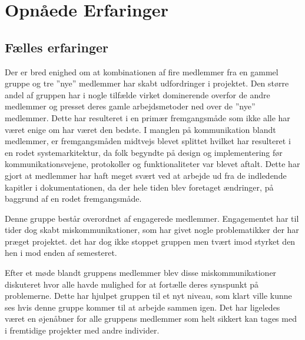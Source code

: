 \chapter{Opnåede Erfaringer}
\section{Fælles erfaringer}
Der er bred enighed om at kombinationen af fire medlemmer fra en gammel gruppe og tre ''nye'' medlemmer har skabt udfordringer i projektet. Den større andel af gruppen har i nogle tilfælde virket dominerende overfor de andre medlemmer og presset deres gamle arbejdsmetoder ned over de ''nye'' medlemmer. Dette har resulteret i en primær fremgangsmåde som ikke alle har været enige om har været den bedste. I manglen på kommunikation blandt medlemmer, er fremgangsmåden midtvejs blevet splittet hvilket har resulteret i en rodet systemarkitektur, da folk begyndte på design og implementering før kommunikationsvejene, protokoller og funktionaliteter var blevet aftalt. Dette har gjort at medlemmer har haft meget svært ved at arbejde ud fra de indledende kapitler i dokumentationen, da der hele tiden blev foretaget ændringer, på baggrund af en rodet fremgangsmåde.

Denne gruppe består overordnet af engagerede medlemmer. Engagementet har til tider dog skabt miskommunikationer, som har givet nogle problematikker der har præget projektet. det har dog ikke stoppet gruppen men tvært imod styrket den hen i mod enden af semesteret.

Efter et møde blandt gruppens medlemmer blev disse miskommunikationer diskuteret hvor alle havde mulighed for at fortælle deres synspunkt på problemerne. Dette har hjulpet gruppen til et nyt niveau, som klart ville kunne ses hvis denne gruppe kommer til at arbejde sammen igen. Det har ligeledes været en øjenåbner for alle gruppens medlemmer som helt sikkert kan tages med i fremtidige projekter med andre individer.









\clearpage